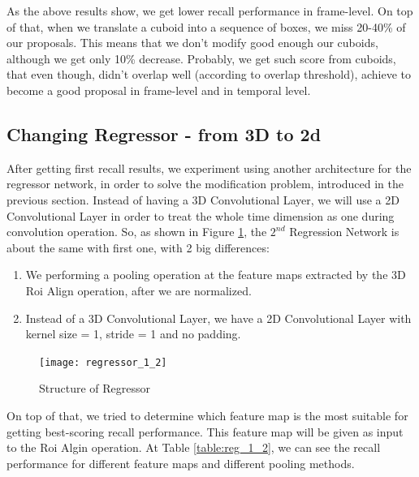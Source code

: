 As the above results show, we get lower recall performance in frame-level. On top of that, when we translate a cuboid into
a sequence of boxes, we miss 20-40\% of our proposals. This means that we don't modify good enough our cuboids, although
we get only 10\% decrease. Probably, we get such score from cuboids, that even though, didn't overlap well (according to
overlap threshold), achieve to become a good proposal in frame-level and in temporal level. 


\subsection{Changing Regressor - from 3D to 2d}
After getting first recall results, we experiment using another architecture for the regressor network, in order to solve the modification
problem, introduced in the previous section. Instead of having a 3D Convolutional Layer, we will use a 2D Convolutional Layer
in order to treat the whole time dimension as one during convolution operation. So, as shown in Figure \ref{fig:reg_1_2},
the $2^{nd}$ Regression Network is about the same with first one, with 2 big differences:
\begin{enumerate}
\item We performing a pooling operation at the feature maps extracted by the 3D Roi Align operation, after we are normalized.
\item Instead of a 3D Convolutional Layer, we have a 2D Convolutional Layer with kernel size = 1, stride = 1 and no padding.
\end{enumerate}

\begin{figure}[h]

  \centering
  \texttt{[image: regressor\_1\_2]}
  \caption{Structure of Regressor}
  \label{fig:reg_1_2}
\end{figure}

On top of that, we tried to determine which feature map is the most suitable  for getting best-scoring recall performance. This feature map will be given as
input to the Roi Algin operation.  At Table \ref{table:reg_1_2}, we can see the recall performance for different feature maps and different pooling methods.

